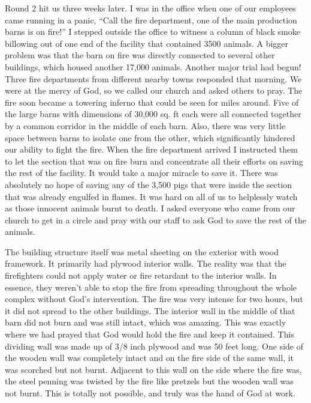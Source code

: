 \documentclass[oneside]{book}
\begin{document}
Round 2 hit us three weeks later. I was in the office when one of our employees came running in a panic, “Call the fire department, one of the main production barns is on fire!” I stepped outside the office to witness a column of black smoke billowing out of one end of the facility that contained 3500 animals. A bigger problem was that the barn on fire was directly connected to several other buildings, which housed another 17,000 animals. Another major trial had begun! Three fire departments from different nearby towns responded that morning. We were at the mercy of God, so we called our church and asked others to pray. The fire soon became a towering inferno that could be seen for miles around. Five of the large barns with dimensions of 30,000 sq. ft each were all connected together by a common corridor in the middle of each barn. Also, there was very little space between barns to isolate one from the other, which significantly hindered our ability to fight the fire. When the fire department arrived I instructed them to let the section that was on fire burn and concentrate all their efforts on saving the rest of the facility. It would take a major miracle to save it. There was absolutely no hope of saving any of the 3,500 pigs that were inside the section that was already engulfed in flames. It was hard on all of us to helplessly watch as those innocent animals burnt to death. I asked everyone who came from our church to get in a circle and pray with our staff to ask God to save the rest of the animals.

The building structure itself was metal sheeting on the exterior with wood framework. It primarily had plywood interior walls. The reality was that the firefighters could not apply water or fire retardant to the interior walls. In essence, they weren’t able to stop the fire from spreading throughout the whole complex without God's intervention. The fire was very intense for two hours, but it did not spread to the other buildings. The interior wall in the middle of that barn did not burn and was still intact, which was amazing. This was exactly where we had prayed that God would hold the fire and keep it contained. This dividing wall was made up of 3/8 inch plywood and was 50 feet long. One side of the wooden wall was completely intact and on the fire side of the same wall, it was scorched but not burnt. Adjacent to this wall on the side where the fire was, the steel penning was twisted by the fire like pretzels but the wooden wall was not burnt. This is totally not possible, and truly was the hand of God at work.
\end{document}
